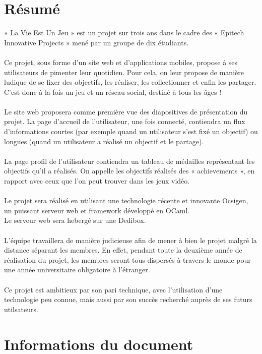\documentclass{life-fr}
\begin{document}
\chapter*{Résumé}
{
  « La Vie Est Un Jeu » est un projet sur trois ans dans le cadre des « Epitech
  Innovative Projects » mené par un groupe de dix étudiants.\\
  \\
  Ce projet, sous forme d'un site web et d'applications mobiles, propose à
  ses utilisateurs de pimenter leur quotidien. Pour cela, on leur propose
  de manière ludique de se fixer des objectifs, les réaliser, les collectionner
  et enfin les partager.\\
  C'est donc à la fois un jeu et un réseau social, destiné à tous les âges !\\
  \\
  Le site web proposera comme première vue des diapositives de présentation du
  projet. La page d'accueil de l'utilisateur, une fois connecté, contiendra un
  flux d'informations courtes (par exemple quand un utilisateur s'est fixé un
  objectif) ou longues (quand un utilisateur a réalisé un objectif et le partage).
  \\\\
  La page profil de l'utilisateur contiendra un tableau de médailles représentant
  les objectifs qu'il a réalisés. On appelle les objectifs réalisés des
  « achievements », en rapport avec ceux que l'on peut trouver dans les jeux
  vidéo.\\
  \\
  Le projet sera réalisé en utilisant une technologie récente et innovante
  Ocsigen, un puissant serveur web et framework développé en OCaml.\\
  Le serveur web sera hebergé sur une Dedibox.\\
  \\
  L'équipe travaillera de manière judicieuse afin de mener à bien le projet
  malgré la distance séparant les membres. En effet, pendant toute la deuxième
  année de réalisation du projet, les membres seront tous dispersés à travers
  le monde pour une année universitaire obligatoire à l'étranger.\\
  \\
  Ce projet est ambitieux par son pari technique, avec l'utilisation d'une
  technologie peu connue, mais aussi par son succès recherché auprès de ses
  futurs utilsateurs.
}

\chapter*{Informations du document}
\end{document}
